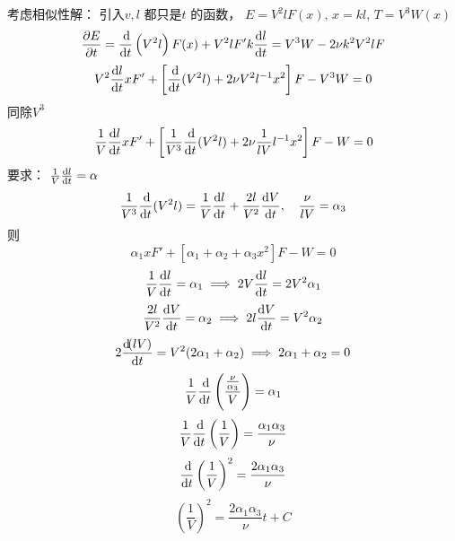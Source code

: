 \documentclass[12pt]{ctexart}
\begin{document}
考虑相似性解： 引入$v,l$ 都只是$t$ 的函数， $E = V^2 l F(x),\, x = kl$, $T = V^3 W(x)$
\begin{equation}
   \frac{\partial E}{\partial t} = \frac{\dif }{\dif t} \left( V^2 l \right) F(x) + V^2 l F' k \frac{\dif l}{\dif t} = V^3 W - 2 \nu k^2 V^2 l F
\end{equation}
\begin{equation}
   V^2 \frac{\dif l}{\dif t} x F' + \left[ \frac{\dif }{\dif t} (V^2l) + 2\nu V^2 l^{-1} x^2 \right] F - V^3 W = 0
\end{equation}
同除$V^3$
\begin{equation}
   \frac{1}{V} \frac{\dif l}{\dif t} x F' + \left[ \frac{1}{V^3}\frac{\dif }{\dif t} (V^2l) + 2\nu \frac{1}{lV} l^{-1} x^2 \right] F - W = 0
\end{equation}
要求： $\frac{1}{V} \frac{\dif l}{\dif t} = \alpha$
\begin{equation}
   \frac{1}{V^3} \frac{\dif }{\dif t}(V^2l) = \frac{1}{V} \frac{\dif l}{\dif t} + \frac{2l}{V^2} \frac{\dif V}{\dif t}, \quad \frac{\nu}{lV} = \alpha_3
\end{equation}
则
\begin{equation}
   \alpha_1 x F' + \left[ \alpha_1 + \alpha_2 + \alpha_3 x^2 \right] F - W = 0
\end{equation}
\begin{equation}
   \frac{1}{V} \frac{\dif l}{\dif t} = \alpha_1 \implies 2 V \frac{\dif l}{\dif t} = 2V^2\alpha_1
\end{equation}
\begin{equation}
   \frac{2l}{V^2} \frac{\dif V}{\dif t} = \alpha_2 \implies 2l \frac{\dif V}{\dif t} = V^2 \alpha_2
\end{equation}
\begin{equation}
   2 \frac{\dif (lV)}{\dif t} = V^2(2\alpha_1+\alpha_2) \implies 2\alpha_1+\alpha_2 = 0
\end{equation}
\begin{equation}
   \frac{1}{V} \frac{\dif }{\dif t} \left( \frac{\frac{\nu}{\alpha_3}}{V} \right)  = \alpha_1
\end{equation}
\begin{equation}
   \frac{1}{V} \frac{\dif }{\dif t}\left( \frac{1}{V} \right) = \frac{\alpha_1 \alpha_3}{\nu}
\end{equation}
\begin{equation}
   \frac{\dif }{\dif t} \left( \frac{1}{V} \right) ^2 = \frac{2 \alpha_1 \alpha_3}{\nu}
\end{equation}
\begin{equation}
   \left( \frac{1}{V} \right) ^2 = \frac{2\alpha_1\alpha_3}{\nu}t + C
\end{equation}
\end{document}
